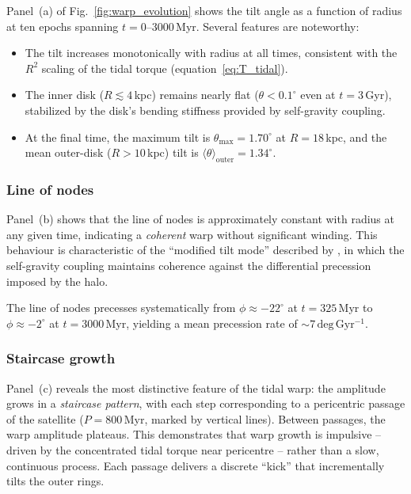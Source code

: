 Panel~(a) of Fig.~\ref{fig:warp_evolution} shows the tilt angle as a function of radius at ten epochs spanning $t=0$--$3000$\,Myr. Several features are noteworthy:
\begin{itemize}
    \item The tilt increases monotonically with radius at all times, consistent with the $R^2$ scaling of the tidal torque (equation~\ref{eq:T_tidal}).
    \item The inner disk ($R\lesssim4$\,kpc) remains nearly flat ($\theta < 0.1^\circ$ even at $t=3$\,Gyr), stabilized by the disk's bending stiffness provided by self-gravity coupling.
    \item At the final time, the maximum tilt is $\theta_\mathrm{max}=1.70^\circ$ at $R=18$\,kpc, and the mean outer-disk ($R>10$\,kpc) tilt is $\langle\theta\rangle_\mathrm{outer}=1.34^\circ$.
\end{itemize}

\subsubsection{Line of nodes}

Panel~(b) shows that the line of nodes is approximately constant with radius at any given time, indicating a \emph{coherent} warp without significant winding. This behaviour is characteristic of the ``modified tilt mode'' described by \citet{sparke1988}, in which the self-gravity coupling maintains coherence against the differential precession imposed by the halo.

The line of nodes precesses systematically from $\phi\approx-22^\circ$ at $t=325$\,Myr to $\phi\approx-2^\circ$ at $t=3000$\,Myr, yielding a mean precession rate of ${\sim}7\,\mathrm{deg\,Gyr^{-1}}$.

\subsubsection{Staircase growth}

Panel~(c) reveals the most distinctive feature of the tidal warp: the amplitude grows in a \emph{staircase pattern}, with each step corresponding to a pericentric passage of the satellite ($P=800$\,Myr, marked by vertical lines). Between passages, the warp amplitude plateaus. This demonstrates that warp growth is impulsive -- driven by the concentrated tidal torque near pericentre -- rather than a slow, continuous process. Each passage delivers a discrete ``kick'' that incrementally tilts the outer rings.

